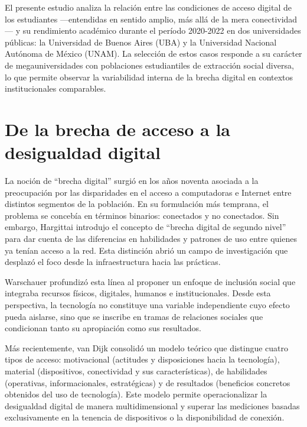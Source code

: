 El presente estudio analiza la relación entre las condiciones de acceso digital de los estudiantes —entendidas en sentido amplio, más allá de la mera conectividad— y su rendimiento académico durante el período 2020-2022 en dos universidades públicas: la Universidad de Buenos Aires (UBA) y la Universidad Nacional Autónoma de México (UNAM). La selección de estos casos responde a su carácter de megauniversidades con poblaciones estudiantiles de extracción social diversa, lo que permite observar la variabilidad interna de la brecha digital en contextos institucionales comparables.


\section{De la brecha de acceso a la desigualdad digital}
La noción de “brecha digital” surgió en los años noventa asociada a la preocupación por las disparidades en el acceso a computadoras e Internet entre distintos segmentos de la población. En su formulación más temprana, el problema se concebía en términos binarios: conectados y no conectados. Sin embargo, Hargittai \autocite*{2565-HARGITTAI2002} introdujo el concepto de “brecha digital de segundo nivel” para dar cuenta de las diferencias en habilidades y patrones de uso entre quienes ya tenían acceso a la red. Esta distinción abrió un campo de investigación que desplazó el foco desde la infraestructura hacia las prácticas.

Warschauer \autocite*{2562-WARSCHAUER2004} profundizó esta línea al proponer un enfoque de inclusión social que integraba recursos físicos, digitales, humanos e institucionales. Desde esta perspectiva, la tecnología no constituye una variable independiente cuyo efecto pueda aislarse, sino que se inscribe en tramas de relaciones sociales que condicionan tanto su apropiación como sus resultados.

Más recientemente, van Dijk \autocite*{2563-VANDIJK2020} consolidó un modelo teórico que distingue cuatro tipos de acceso: motivacional (actitudes y disposiciones hacia la tecnología), material (dispositivos, conectividad y sus características), de habilidades (operativas, informacionales, estratégicas) y de resultados (beneficios concretos obtenidos del uso de tecnología). Este modelo permite operacionalizar la desigualdad digital de manera multidimensional y superar las mediciones basadas exclusivamente en la tenencia de dispositivos o la disponibilidad de conexión.



